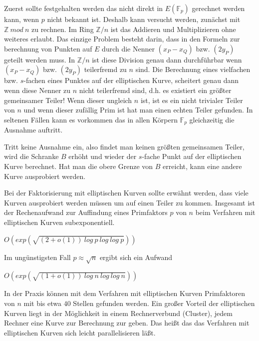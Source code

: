 \documentclass[10pt, bigheadings]{scrartcl}
\begin{document}
Zuerst sollte festgehalten werden das nicht direkt in 
$E(\mathbb F_p)$ gerechnet werden kann, wenn $p$ nicht bekannt ist. Deshalb kann
versucht werden, zunächst mit $\mathbb Z\ mod\ n$ zu rechnen. Im Ring 
$\mathbb Z/n$ ist das Addieren und Multiplizieren ohne weiteres erlaubt. Das 
einzige Problem besteht darin, dass in den Formeln zur berechnung von Punkten
auf $E$ durch die Nenner $(x_P-x_Q)$ bzw. $(2y_P)$ geteilt werden muss. In 
$\mathbb Z/n$ ist diese Division genau dann durchführbar wenn $(x_P-x_Q)$ bzw.
 $(2y_P)$ teilerfremd zu $n$ sind. Die Berechnung eines vielfachen bzw. 
$s$-fachen eines Punktes auf der elliptischen Kurve, scheitert genau dann
wenn diese Nenner zu $n$ nicht teilerfremd sind, d.h. es existiert ein
größter gemeinsamer Teiler! Wenn dieser ungleich $n$ ist, ist es ein nicht 
trivialer Teiler von $n$ und wenn dieser zufällig Prim ist hat man einen 
echten Teiler gefunden. In seltenen Fällen kann es vorkommen das in allen 
Körpern $\mathbb F_p$ gleichzeitig die Ausnahme auftritt. 

Tritt keine Ausnahme ein, also findet man keinen größten gemeinsamen Teiler,
wird die Schranke $B$ erhöht und wieder der $s$-fache Punkt auf der elliptischen
Kurve berechnet. Hat man die obere Grenze von $B$ erreicht, kann eine andere 
Kurve ausprobiert werden. 

Bei der Faktorisierung mit elliptischen Kurven sollte erwähnt werden, dass viele
Kurven ausprobiert werden müssen um auf einen Teiler zu kommen. Insgesamt ist
der Rechenaufwand zur Auffindung eines Primfaktors $p$ von $n$ beim Verfahren
mit elliptischen Kurven subexponentiell. 
\begin{center}
$O(exp(\sqrt{(2+o(1))\ log\ p\ log\ log\ p}))$
\end{center}
Im ungünstigsten Fall $p\approx \sqrt{n}$ ergibt sich ein Aufwand 
\begin{center}
$O(exp(\sqrt{(1+o(1))\ log\ n\ log\ log\ n}))$
\end{center}
In der Praxis können mit dem Verfahren mit elliptischen Kurven Primfaktoren von 
$n$ mit bis etwa $40$ Stellen gefunden werden. Ein großer Vorteil der elliptischen
Kurven liegt in der Möglichkeit in einem Rechnerverbund (Cluster), jedem Rechner
eine Kurve zur Berechnung zur geben. Das heißt das das Verfahren mit elliptischen
Kurven sich leicht parallelisieren läßt.
\end{document}

